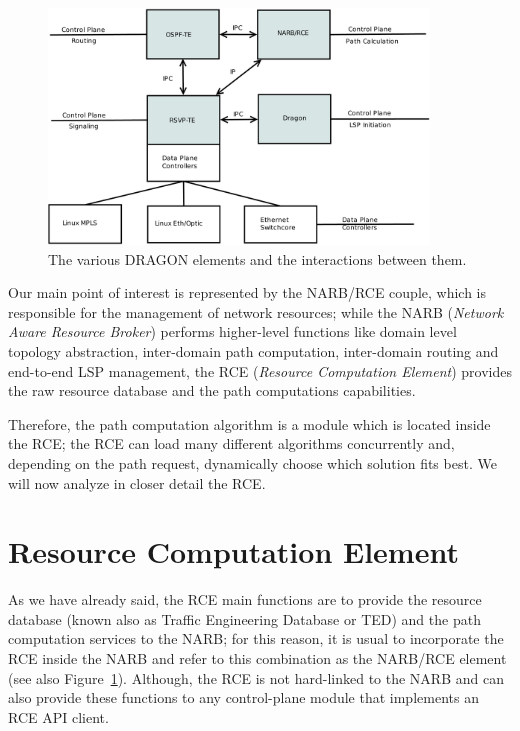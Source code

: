 \documentclass[10pt,a4paper]{report}
\begin{document}
\begin{figure}[!htbp]
  \begin{center}
    \includegraphics[width=0.9\textwidth]{img/dragon_model}
    \caption[DRAGON model]{The various DRAGON elements and the
      interactions between them.}
    \label{fig:dragon_model}
  \end{center}
\end{figure}

Our main point of interest is represented by the NARB/RCE couple,
which is responsible for the management of network resources; while
the NARB (\textit{Network Aware Resource Broker}) performs
higher-level functions like domain level topology abstraction,
inter-domain path computation, inter-domain routing and end-to-end LSP
management, the RCE (\textit{Resource Computation Element}) provides
the raw resource database and the path computations capabilities.

Therefore, the path computation algorithm is a module which is
located inside the RCE; the RCE can load many different algorithms
concurrently and, depending on the path request, dynamically choose
which solution fits best. We will now analyze in closer detail the
RCE.

\section{Resource Computation Element}

As we have already said, the RCE main functions are to provide the
resource database (known also as Traffic Engineering Database or TED)
and the path computation services to the NARB; for this reason, it is
usual to incorporate the RCE inside the NARB and refer to this
combination as the NARB/RCE element (see also
Figure~\ref{fig:dragon_model}). Although, the RCE is not hard-linked
to the NARB and can also provide these functions to any control-plane
module that implements an RCE API client.
\end{document}
